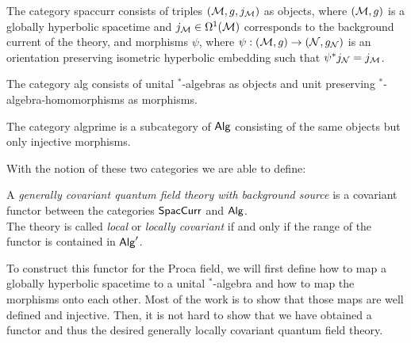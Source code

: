 \begin{definition}\label{def:categories_alg_spaccurr}
The category \gls{spaccurr} consists of triples $(\mathcal{M},g,j_{\mathcal{M}})$ as objects, where $(\mathcal{M},g)$ is a globally hyperbolic spacetime  and $j_{\mathcal{M}} \in \Omega^1(\mathcal{M})$ corresponds to the background current of the theory,
and morphisms $\psi$, where $\psi : (\mathcal{M},g) \to (\mathcal{N},g_{\mathcal{N}})$ is an orientation preserving isometric hyperbolic embedding such that $\psi^* j_{\mathcal{N}} = j_{\mathcal{M}}$. \par
The category \gls{alg} consists of unital $^*$-algebras as objects and unit preserving  $^*$-algebra-homomorphisms as morphisms. \par
The category \gls{algprime} is a subcategory of $\mathsf{Alg}$ consisting of the same objects but only injective morphisms.
\end{definition}
With the notion of these two categories we are able to define:
%
\begin{definition}\label{def:generally-coveriant-qftcs}
A \emph{generally covariant quantum field theory with background source} is a covariant functor between the categories $\mathsf{SpacCurr}$ and $\mathsf{Alg}$. \\
The theory is called \emph{local} or \emph{locally covariant} if and only if the range of the functor is contained in $\mathsf{Alg}'$.
\end{definition}
%
%
%
%
%
%
To construct this functor for the Proca field, we will first define how to map a globally hyperbolic spacetime to a unital $^*$-algebra and how to map the morphisms onto each other. Most of the work is to show that those maps are well defined and injective. Then, it is not hard to show that we have obtained a functor and thus the desired generally locally covariant quantum field theory.
%
